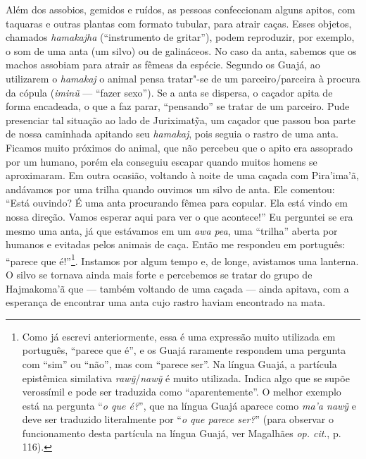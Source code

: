 Além dos assobios, gemidos e ruídos, as pessoas confeccionam alguns
apitos, com taquaras e outras plantas com formato tubular, para atrair
caças. Esses objetos, chamados \emph{hamakajha} (``instrumento de
gritar''), podem reproduzir, por exemplo, o som de uma anta (um silvo) ou
de galináceos. No caso da anta, sabemos que os machos assobiam para
atrair as fêmeas da espécie. Segundo os Guajá, ao utilizarem o
\emph{hamakaj} o animal pensa tratar"-se de um parceiro/parceira à
procura da cópula (\emph{iminũ} --- ``fazer sexo''). Se a anta se dispersa,
o caçador apita de forma encadeada, o que a faz parar, ``pensando'' se
tratar de um parceiro. Pude presenciar tal situação ao lado de
Juriximatỹa, um caçador que passou boa parte de nossa caminhada apitando
seu \emph{hamakaj}, pois seguia o rastro de uma anta. Ficamos muito
próximos do animal, que não percebeu que o apito era assoprado por um
humano, porém ela conseguiu escapar quando muitos homens se aproximaram.
Em outra ocasião, voltando à noite de uma caçada com Pira'ima'ã,
andávamos por uma trilha quando ouvimos um silvo de anta. Ele comentou:
``Está ouvindo? É uma anta procurando fêmea para copular. Ela está vindo
 em nossa direção. Vamos esperar aqui para ver o que acontece!'' Eu
perguntei se era mesmo uma anta, já que estávamos em um \emph{awa}
\emph{pea}, uma ``trilha'' aberta por humanos e evitadas pelos animais de
caça. Então me respondeu em português: ``parece que é!''\footnote{Como já
  escrevi anteriormente, essa é uma expressão muito utilizada em
  português, ``parece que é'', e os Guajá raramente respondem uma pergunta
  com ``sim'' ou ``não'', mas com ``parece ser''. Na língua Guajá, a
  partícula epistêmica similativa \emph{rawỹ}/\emph{nawỹ} é muito
  utilizada. Indica algo que se supõe verossímil e pode ser traduzida
  como ``aparentemente''. O melhor exemplo está na pergunta ``\emph{o que
  é?}'', que na língua Guajá aparece como \emph{ma'a nawỹ} e deve ser
  traduzido literalmente por ``\emph{o que parece ser?}'' (para observar o
  funcionamento desta partícula na língua Guajá, ver Magalhães \emph{op. cit}., p. 116).}. Instamos por algum tempo e, de longe, avistamos uma lanterna.
O silvo se tornava ainda mais forte e percebemos se tratar do grupo de
Hajmakoma'ã que --- também voltando de uma caçada --- ainda apitava, com a
esperança de encontrar uma anta cujo rastro haviam encontrado na mata.

